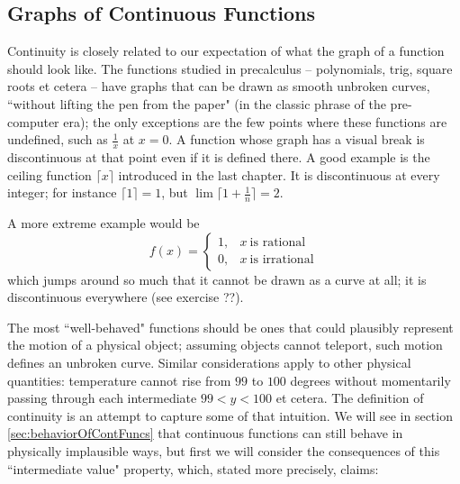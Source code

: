 \subsection{Graphs of Continuous Functions}
Continuity is closely related to our expectation of what the graph of a function should look like. The functions studied in precalculus -- polynomials, trig, square roots et cetera -- have graphs that can be drawn as smooth unbroken curves, ``without lifting the pen from the paper" (in the classic phrase of the pre-computer era); the only exceptions are the few points where these functions are undefined, such as $\frac{1}{x}$ at $x=0$. A function whose graph has a visual break is discontinuous at that point even if it is defined there. A good example is the ceiling function $\lceil x \rceil$ introduced in the last chapter. It is discontinuous at every integer; for instance $\lceil 1 \rceil = 1$, but $\lim \lceil 1 + \frac{1}{n} \rceil = 2$.

A more extreme example would be
\[
f(x) = \begin{cases}
1, &x\  \text{is rational}\\
0, &x\  \text{is irrational}
\end{cases}
\]
which jumps around so much that it cannot be drawn as a curve at all; it is discontinuous everywhere (see exercise ??). 

The most ``well-behaved" functions should be ones that could plausibly represent the motion of a physical object; assuming objects cannot teleport, such motion defines an unbroken curve. Similar considerations apply to other physical quantities: temperature cannot rise from $99$ to $100$ degrees without momentarily passing through each intermediate $99 < y < 100$ et cetera. The definition of continuity is an attempt to capture some of that intuition. We will see in section \ref{sec:behaviorOfContFuncs} that continuous functions can still behave in physically implausible ways, but first we will consider the consequences of this ``intermediate value" property, which, stated more precisely, claims:

